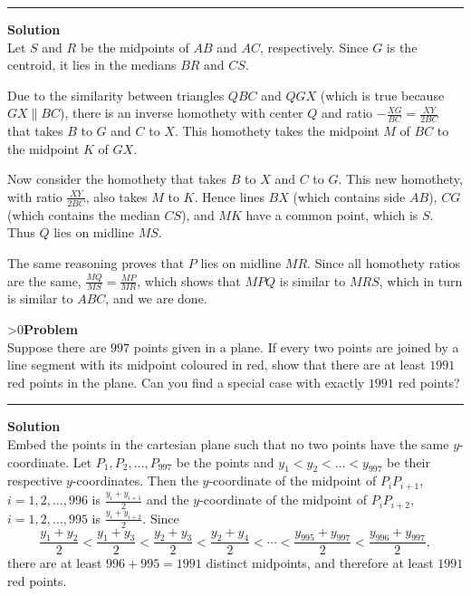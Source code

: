 \documentclass[12pt,oneside,a4paper]{book}
\newcounter{probnum}
\newcounter{solnum}
\newcommand{\prob}{\ifnum\value{probnum}>0\newpage\fi\setcounter{solnum}{0}\stepcounter{probnum}\textbf{Problem \theprobnum}\\}
\newcommand{\sol}{\medskip\hrule\medbreak\textbf{Solution}\\}
\newcommand{\soln}{\stepcounter{solnum}\medskip\hrule\medbreak\textbf{Solution \thesolnum}\\}
\begin{document}
\soln
Let $S$ and $R$ be the midpoints of $AB$ and $AC$, respectively. Since $G$ is the centroid, it lies in the medians $BR$ and $CS$.
\begin{center}
\end{center}

Due to the similarity between triangles $QBC$ and $QGX$ (which is true because $GX\parallel BC$), there is an inverse homothety with center $Q$ and ratio $-\frac{XG}{BC} = \frac{XY}{2BC}$ that takes $B$ to $G$ and $C$ to $X$. This homothety takes the midpoint $M$ of $BC$ to the midpoint $K$ of $GX$.

Now consider the homothety that takes $B$ to $X$ and $C$ to $G$. This new homothety, with ratio $\frac{XY}{2BC}$, also takes $M$ to $K$. Hence lines $BX$ (which contains side $AB$), $CG$ (which contains the median $CS$), and $MK$ have a common point, which is $S$. Thus $Q$ lies on midline $MS$.

The same reasoning proves that $P$ lies on midline $MR$. Since all homothety ratios are the same, $\frac{MQ}{MS} = \frac{MP}{MR}$, which shows that $MPQ$ is similar to $MRS$, which in turn is similar to $ABC$, and we are done.

\prob Suppose there are $997$ points given in a plane. If every two points are joined by a line segment with its midpoint coloured in red, show that there are at least $1991$ red points in the plane. Can you find a special case with exactly $1991$ red points?

\sol
Embed the points in the cartesian plane such that no two points have the same $y$-coordinate. Let $P_1,P_2,\ldots,P_{997}$ be the points and $y_1 < y_2 < \ldots < y_{997}$ be their respective $y$-coordinates. Then the $y$-coordinate of the midpoint of $P_iP_{i+1}$, $i=1,2,\ldots,996$ is $\frac{y_i+y_{i+1}}2$ and the $y$-coordinate of the midpoint of $P_iP_{i+2}$, $i=1,2,\ldots,995$ is $\frac{y_i+y_{i+2}}2$. Since
\[\frac{y_1+y_2}2 < \frac{y_1+y_3}2 < \frac{y_2+y_3}2 < \frac{y_2+y_4}2 < \cdots < \frac{y_{995}+y_{997}}2 < \frac{y_{996}+y_{997}}2,\]
there are at least $996+995=1991$ distinct midpoints, and therefore at least $1991$ red points.
\end{document}
